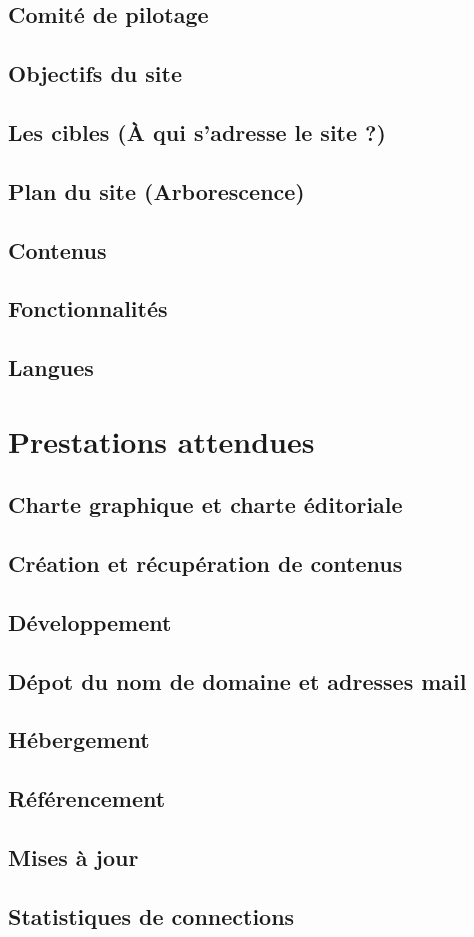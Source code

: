 \documentclass[oneside]{report}
\begin{document}
{		\section{Comité de pilotage}
		\section{Objectifs du site}
		\section{Les cibles (À qui s'adresse le site ?)}
		\section{Plan du site (Arborescence)}
		\section{Contenus}
		\section{Fonctionnalités}
		\section{Langues}
	}
	\chapter{Prestations attendues}
	{
		\section{Charte graphique et charte éditoriale}
		\section{Création et récupération de contenus}
		\section{Développement}
		\section{Dépot du nom de domaine et adresses mail}
		\section{Hébergement}
		\section{Référencement}
		\section{Mises à jour}
		\section{Statistiques de connections}
	}
\end{document}
